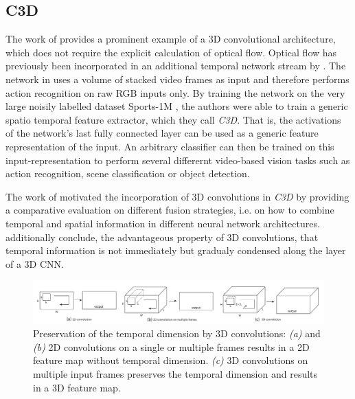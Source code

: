 \subsection{C3D}
The work of \textcite{tran_learning_2015} provides a prominent example of a 3D convolutional architecture, which does not require the explicit calculation of optical flow.
Optical flow has previously been incorporated in an additional temporal network stream by \textcite{simonyan_two-stream_2014}.
The network in \cite{tran_learning_2015} uses a volume of stacked video frames as input and therefore performs action recognition on raw RGB inputs only.
By training the network on the very large noisily labelled dataset Sports-1M \cite{karpathy_large-scale_2014}, the authors were able to train a generic spatio temporal feature extractor, which they call \textit{C3D}.
That is, the activations of the network's last fully connected layer can be used as a generic feature representation of the input.
An arbitrary classifier can then be trained on this input-representation to perform several differernt video-based vision tasks such as action recognition, scene classification or object detection.

The work of \textcite{karpathy_large-scale_2014} motivated the incorporation of 3D convolutions in \textit{C3D} by providing a comparative evaluation on different fusion strategies, i.e. on how to combine temporal and spatial information in different neural network architectures.
\textcite{tran_learning_2015} additionally conclude, the advantageous property of 3D convolutions, that temporal information is not immediately but gradualy condensed along the layer of a 3D CNN.

\begin{figure}[H]
    \centering
    \includegraphics[width=\textwidth]{img_related/c3d_2dconv3dconv}
    \caption{Preservation of the temporal dimension by 3D convolutions: \textit{(a)} and \textit{(b)} 2D convolutions on a single or multiple frames results in a 2D feature map without temporal dimension. \textit{(c)} 3D convolutions on multiple input frames preserves the temporal dimension and results in a 3D feature map. \cite{tran_learning_2015}}
    \label{fig:c3d_2dconv3dconv}
\end{figure}

